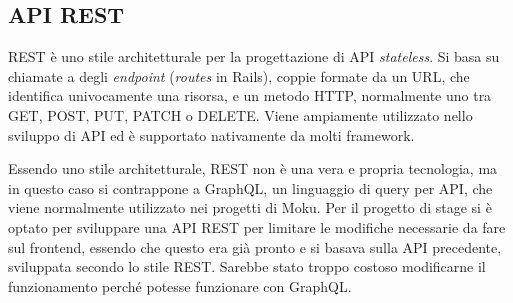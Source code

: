 \subsection{API REST}
REST è uno stile architetturale per la progettazione di API \emph{stateless}. Si basa su chiamate a degli \emph{endpoint} (\emph{routes} in Rails), coppie formate da un URL, che identifica univocamente una risorsa, e un metodo HTTP, normalmente uno tra GET, POST, PUT, PATCH o DELETE. Viene ampiamente utilizzato nello sviluppo di API ed è supportato nativamente da molti framework.

Essendo uno stile architetturale, REST non è una vera e propria tecnologia, ma in questo caso si contrappone a GraphQL, un linguaggio di query per API, che viene normalmente utilizzato nei progetti di Moku. Per il progetto di stage si è optato per sviluppare una API REST per limitare le modifiche necessarie da fare sul frontend, essendo che questo era già pronto e si basava sulla API precedente, sviluppata secondo lo stile REST. Sarebbe stato troppo costoso modificarne il funzionamento perché potesse funzionare con GraphQL.
